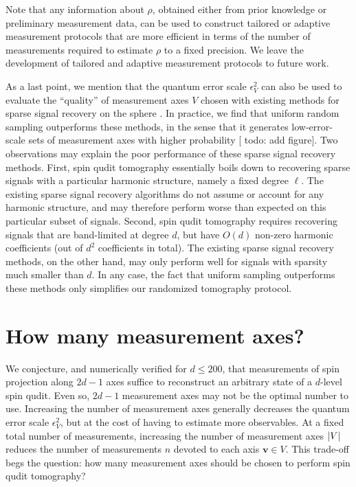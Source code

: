 \documentclass[notitlepage,twocolumn]{revtex4-2}
\renewcommand{\v}{\bm} %
\newcommand{\1}{\mathds{1}}
\newcommand{\red}[1]{{\color{red} #1}}
\begin{document}
Note that any information about $\rho$, obtained either from prior knowledge or preliminary measurement data, can be used to construct tailored or adaptive measurement protocols \cite{pereira2018adaptive} that are more efficient in terms of the number of measurements required to estimate $\rho$ to a fixed precision.
We leave the development of tailored and adaptive measurement protocols to future work.

As a last point, we mention that the quantum error scale $\epsilon_V^2$ can also be used to evaluate the ``quality'' of measurement axes $V$ chosen with existing methods for sparse signal recovery on the sphere \cite{rauhut2011sparse, alem2012sparse}.
In practice, we find that uniform random sampling outperforms these methods, in the sense that it generates low-error-scale sets of measurement axes with higher probability [\red{todo: add figure}].
Two observations may explain the poor performance of these sparse signal recovery methods.
First, spin qudit tomography essentially boils down to recovering sparse signals with a particular harmonic structure, namely a fixed degree $\ell$.
The existing sparse signal recovery algorithms do not assume or account for any harmonic structure, and may therefore perform worse than expected on this particular subset of signals.
Second, spin qudit tomography requires recovering signals that are band-limited at degree $d$, but have $O(d)$ non-zero harmonic coefficients (out of $d^2$ coefficients in total).
The existing sparse signal recovery methods, on the other hand, may only perform well for signals with sparsity much smaller than $d$.
In any case, the fact that uniform sampling outperforms these methods only simplifies our randomized tomography protocol.

\section{How many measurement axes?}
\label{sec:axes}

We conjecture, and numerically verified for $d\le200$, that measurements of spin projection along $2d-1$ axes suffice to reconstruct an arbitrary state of a $d$-level spin qudit.
Even so, $2d-1$ measurement axes may not be the optimal number to use.
Increasing the number of measurement axes generally decreases the quantum error scale $\epsilon_V^2$, but at the cost of having to estimate more observables.
At a fixed total number of measurements, increasing the number of measurement axes $\abs{V}$ reduces the number of measurements $n$ devoted to each axis $\v v\in V$.
This trade-off begs the question: how many measurement axes should be chosen to perform spin qudit tomography?
\end{document}
